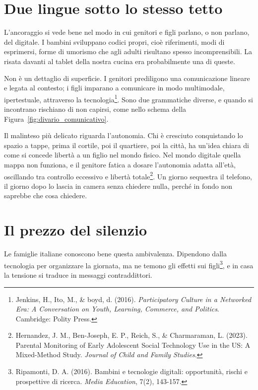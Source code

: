\section{Due lingue sotto lo stesso tetto}

L'ancoraggio si vede bene nel modo in cui genitori e figli parlano, o non parlano, del digitale. I bambini sviluppano codici propri, cioè riferimenti, modi di esprimersi, forme di umorismo che agli adulti risultano spesso incomprensibili. La risata davanti al tablet della nostra cucina era probabilmente una di queste.

Non è un dettaglio di superficie. I genitori prediligono una comunicazione lineare e legata al contesto; i figli imparano a comunicare in modo multimodale, ipertestuale, attraverso la tecnologia\footnote{Jenkins, H., Ito, M., \& boyd, d. (2016). \textit{Participatory Culture in a Networked Era: A Conversation on Youth, Learning, Commerce, and Politics}. Cambridge: Polity Press.}. Sono due grammatiche diverse, e quando si incontrano rischiano di non capirsi, come nello schema della Figura~\ref{fig:divario_comunicativo}.


Il malinteso più delicato riguarda l'autonomia. Chi è cresciuto conquistando lo spazio a tappe, prima il cortile, poi il quartiere, poi la città, ha un'idea chiara di come si concede libertà a un figlio nel mondo fisico. Nel mondo digitale quella mappa non funziona, e il genitore fatica a dosare l'autonomia adatta all'età, oscillando tra controllo eccessivo e libertà totale\footnote{Hernandez, J. M., Ben-Joseph, E. P., Reich, S., \& Charmaraman, L. (2023). Parental Monitoring of Early Adolescent Social Technology Use in the US: A Mixed-Method Study. \textit{Journal of Child and Family Studies}.}. Un giorno sequestra il telefono, il giorno dopo lo lascia in camera senza chiedere nulla, perché in fondo non saprebbe che cosa chiedere.

\section{Il prezzo del silenzio}

Le famiglie italiane conoscono bene questa ambivalenza. Dipendono dalla tecnologia per organizzare la giornata, ma ne temono gli effetti sui figli\footnote{Ripamonti, D. A. (2016). Bambini e tecnologie digitali: opportunità, rischi e prospettive di ricerca. \textit{Media Education}, 7(2), 143-157.}, e in casa la tensione si traduce in messaggi contraddittori.

